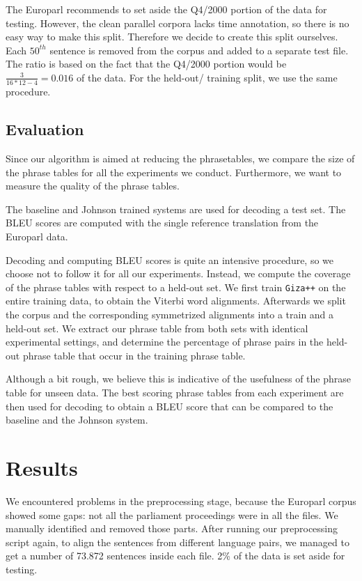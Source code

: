\documentclass[11pt]{article}
\begin{document}
The Europarl recommends to set aside the Q4/2000 portion of the data for testing. However, the clean parallel corpora lacks time annotation, so there is no easy way to make this split. Therefore we decide to create this split ourselves. Each $50^{th}$ sentence is removed from the corpus and added to a separate test file. The ratio is based on the fact that the Q4/2000 portion would be $\frac{3}{16*12-4}=0.016$ of the data. For the held-out/ training split, we use the same procedure.



\subsection{Evaluation}
Since our algorithm is aimed at reducing the phrasetables, we compare the size of the phrase tables for all the experiments we conduct. Furthermore, we want to measure the quality of the phrase tables.

The baseline and Johnson trained systems are used for decoding a test set. The BLEU scores are computed with the single reference translation from the Europarl data.

Decoding and computing BLEU scores is quite an intensive procedure, so we choose not to follow it for all our experiments. Instead, we compute the coverage of the phrase tables with respect to a held-out set. We first train {\tt Giza++} on the entire training data, to obtain the Viterbi word alignments. Afterwards we split the corpus and the corresponding symmetrized alignments into a train and a held-out set. We extract our phrase table from both sets with identical experimental settings, and determine the percentage of phrase pairs in the held-out phrase table that occur in the training phrase table. 

Although a bit rough, we believe this is indicative of the usefulness of the phrase table for unseen data. The best scoring phrase tables from each experiment are then used for decoding to obtain a BLEU score that can be compared to the baseline and the Johnson system. 



\section{Results}

We encountered problems in the preprocessing stage, because the Europarl corpus showed some gaps: not all the parliament proceedings were in all the files. We manually identified and removed those parts. After running our preprocessing script again, to align the sentences from different language pairs, we managed to get a number of 73.872 sentences inside each file. 2\% of the data is set aside for testing.
\end{document}
